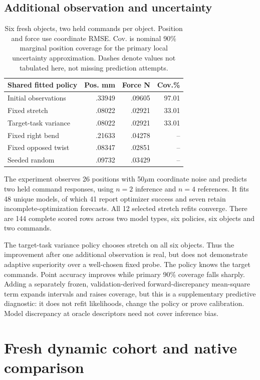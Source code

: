 \documentclass[10pt,twocolumn,letterpaper]{article}
\begin{document}
\subsection{Additional observation and uncertainty}
\begin{table}[t]
\centering\small
\begin{tabular}{lrrr}
\toprule
Shared fitted policy & Pos. mm & Force N & Cov.\%\\
\midrule
Initial observations & .33949 & .09605 &97.01\\
Fixed stretch & .08022 & .02921 &33.01\\
Target-task variance & .08022 & .02921 &33.01\\
Fixed right bend & .21633 & .04278 & --\\
Fixed opposed twist & .08347 & .02851 & --\\
Seeded random & .09732 & .03429 & --\\
\bottomrule
\end{tabular}
\caption{Six fresh objects, two held commands per object. Position and force use coordinate RMSE. Cov. is nominal 90\% marginal position coverage for the primary local uncertainty approximation. Dashes denote values not tabulated here, not missing prediction attempts.}
\end{table}
The experiment observes 26 positions with 50$\mu$m coordinate noise and predicts two held command responses, using $n=2$ inference and $n=4$ references. It fits 48 unique models, of which 41 report optimizer success and seven retain incomplete-optimization forecasts. All 12 selected stretch refits converge. There are 144 complete scored rows across two model types, six policies, six objects and two commands.

The target-task variance policy chooses stretch on all six objects. Thus the improvement after one additional observation is real, but does not demonstrate adaptive superiority over a well-chosen fixed probe. The policy knows the target commands. Point accuracy improves while primary 90\% coverage falls sharply. Adding a separately frozen, validation-derived forward-discrepancy mean-square term expands intervals and raises coverage, but this is a supplementary predictive diagnostic: it does not refit likelihoods, change the policy or prove calibration. Model discrepancy at oracle descriptors need not cover inference bias.

\section{Fresh dynamic cohort and native comparison}
\end{document}
